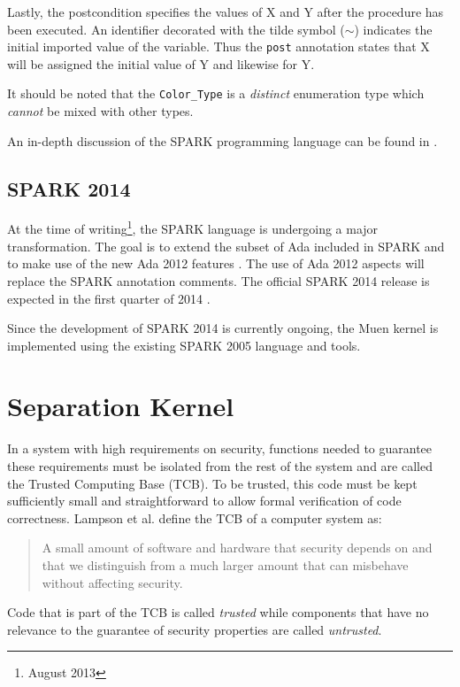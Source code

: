 Lastly, the postcondition specifies the values of X and Y after the procedure
has been executed. An identifier decorated with the tilde symbol ($\sim$)
indicates the initial imported value of the variable. Thus the \texttt{post}
annotation states that X will be assigned the initial value of Y and likewise
for Y.

It should be noted that the \texttt{Color\_Type} is a \emph{distinct}
enumeration type which \emph{cannot} be mixed with other types.

An in-depth discussion of the SPARK programming language can be found in
\cite{BarnesSPARK}.

\subsection{SPARK 2014}
At the time of writing\footnote{August 2013}, the SPARK language is undergoing
a major transformation. The goal is to extend the subset of Ada included in
SPARK and to make use of the new Ada 2012 features \cite{Ada2012}. The use of
Ada 2012 aspects will replace the SPARK annotation comments. The official SPARK
2014 release is expected in the first quarter of 2014
\cite{SPARK2014:Announcement}.

Since the development of SPARK 2014 is currently ongoing, the Muen kernel is
implemented using the existing SPARK 2005 language and tools.




\section{Separation Kernel}
In a system with high requirements on security, functions needed to guarantee
these requirements must be isolated from the rest of the system and are called
the Trusted Computing Base (TCB). To be trusted, this code must be
kept sufficiently small and straightforward to allow formal verification of code
correctness. Lampson et al. \cite{Lampson:1991:ADS:121133.121160} define the TCB
of a computer system as:
\begin{quote}
	A small amount of software and hardware that security depends on and
	that we distinguish from a much larger amount that can misbehave without
	affecting security.
\end{quote}

Code that is part of the TCB is called \emph{trusted} while components that have
no relevance to the guarantee of security properties are called \emph{untrusted}.

